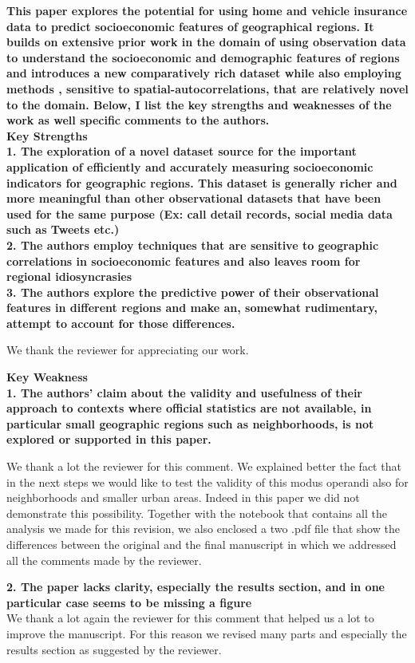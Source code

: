 \documentclass[12pt]{article}
\begin{document}
\textbf{This paper explores the potential for using home and vehicle insurance data to predict socioeconomic features of geographical regions. It builds on extensive prior work in the domain of using observation data to understand the socioeconomic and demographic features of regions and introduces a new comparatively rich dataset while also employing methods , sensitive to spatial-autocorrelations, that are relatively novel to the domain. Below, I list the key strengths and weaknesses of the work as well specific comments to the authors.\\Key Strengths\\1. The exploration of a novel dataset source for the important application of efficiently and accurately measuring socioeconomic indicators for geographic regions. This dataset is generally richer and more meaningful than other observational datasets that have been used for the same purpose (Ex: call detail records, social media data such as Tweets etc.)\\2. The authors employ techniques that are sensitive to geographic correlations in socioeconomic features and also leaves room for regional idiosyncrasies\\3. The authors explore the predictive power of their observational features in different regions and make an, somewhat rudimentary, attempt to account for those differences.}

We thank the reviewer for appreciating our work. 

\vspace{1cm}
\textbf{Key Weakness}\\
\textbf{1. The authors' claim about the validity and usefulness of their approach to contexts where official statistics are not available, in particular small geographic regions such as neighborhoods, is not explored or supported in this paper.}

We thank a lot the reviewer for this comment. We explained better the fact that in the next steps we would like to test the validity of this modus operandi also for neighborhoods and smaller urban areas. Indeed in this paper we did not demonstrate this possibility. Together with the notebook that contains all the analysis we made for this revision, we also enclosed a two .pdf file that show the differences between the original and the final manuscript in which we addressed all the comments made by the reviewer.

\vspace{1cm}
\textbf{2. The paper lacks clarity, especially the results section, and in one particular case seems to be missing a figure}\\
We thank a lot again the reviewer for this comment that helped us a lot to improve the manuscript. For this reason we revised many parts and especially the results section as suggested by the reviewer.
\end{document}
